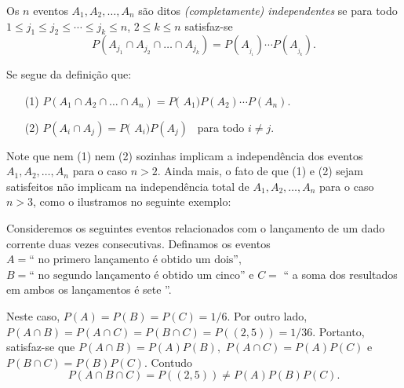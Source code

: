 \begin{frame}
\begin{defi}
Os $n$ eventos $A_{1},A_{2},\ldots ,A_{n}$ são 
ditos \textit{(completamente) independentes} se para todo $1\leq
j_{1}\leq j_{2}\leq \cdots \leq j_{k}\leq n$, $2\leq k\leq n$ satisfaz-se 
$$P(A_{j_{1}}\cap A_{j_{2}}\cap \ldots \cap A_{j_{k}})=P(
A_{_{j_{1}}})\cdots P(A_{_{j_{k}}}).$$
\end{defi}

Se segue da definição que:
\begin{enumerate}
\item[(1)] $P(A_{1}\cap A_{2}\cap \ldots \cap A_{n})=P($ $A_{1})P(A_{2})\cdots
P(A_{n}).$ 
\item[(2)] $P(A_{i}\cap A_{j})=P($ $A_{i})P(A_{j})$ \ para todo $i\neq j$.
\end{enumerate}
Note que nem (1) nem (2) sozinhas  implicam a independência dos eventos $A_{1},A_{2},\ldots ,A_{n}$ para o caso $n>2$. Ainda mais, o fato de que 
(1) e (2) sejam satisfeitos não implicam na independência total de $A_{1},A_{2},\ldots ,A_{n}$  para o caso $n>3$, como o ilustramos no seguinte exemplo:


\begin{exem}
Consideremos os seguintes eventos relacionados com o lançamento de um dado corrente duas vezes consecutivas. Definamos os eventos  
$A = \text{`` no primero lançamento é obtido um dois''}, $ $B =\text{`` no segundo lançamento é obtido um cinco''}$ e 
$C =$ {`` a soma dos resultados em ambos os lançamentos é sete ''}.

Neste caso, $P(A)=P(B)=P(C)=1/6$. Por outro lado, $P(A\cap B)=P(A\cap C)=P(B\cap C)=P((2,5))=1/36$. Portanto, satisfaz-se que 
$P(A\cap B)=P(A)P(B),$ $P(A\cap C)=P(A)P(C)$ e $P(B\cap C)=P(B)P(C).$ Contudo $$P(A\cap B\cap C)=P((2,5))\neq P(A)P(B)P(C).$$
\end{exem}
 
\end{frame}


